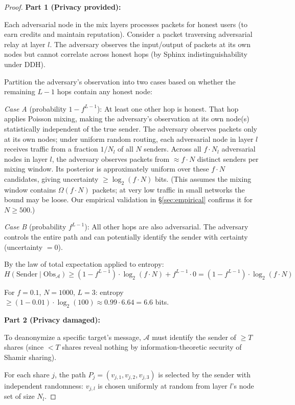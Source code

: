 \documentclass[11pt,a4paper]{article}
\newcommand{\Adv}{\mathcal{A}}
\begin{document}
\begin{proof}
\textbf{Part 1 (Privacy provided):}

Each adversarial node in the mix layers processes packets for honest users (to earn credits and maintain reputation). Consider a packet traversing adversarial relay at layer $l$. The adversary observes the input/output of packets at its own nodes but cannot correlate across honest hops (by Sphinx indistinguishability under DDH).

Partition the adversary's observation into two cases based on whether the remaining $L-1$ hops contain any honest node:

\textit{Case A} (probability $1 - f^{L-1}$): At least one other hop is honest. That hop applies Poisson mixing, making the adversary's observation at its own node(s) statistically independent of the true sender. The adversary observes packets only at its own nodes; under uniform random routing, each adversarial node in layer $l$ receives traffic from a fraction $1/N_l$ of all $N$ senders. Across all $f \cdot N_l$ adversarial nodes in layer $l$, the adversary observes packets from $\approx f \cdot N$ distinct senders per mixing window. Its posterior is approximately uniform over these $f \cdot N$ candidates, giving uncertainty $\geq \log_2(f \cdot N)$ bits. (This assumes the mixing window contains $\Omega(f \cdot N)$ packets; at very low traffic in small networks the bound may be loose. Our empirical validation in \S\ref{sec:empirical} confirms it for $N \geq 500$.)

\textit{Case B} (probability $f^{L-1}$): All other hops are also adversarial. The adversary controls the entire path and can potentially identify the sender with certainty (uncertainty $= 0$).

By the law of total expectation applied to entropy:
\[
H(\text{Sender} \mid \text{Obs}_\Adv) \geq (1 - f^{L-1}) \cdot \log_2(f \cdot N) + f^{L-1} \cdot 0 = (1 - f^{L-1}) \cdot \log_2(f \cdot N)
\]

For $f = 0.1$, $N = 1000$, $L = 3$: entropy $\geq (1 - 0.01) \cdot \log_2(100) \approx 0.99 \cdot 6.64 = 6.6$ bits.

\textbf{Part 2 (Privacy damaged):}

To deanonymize a specific target's message, $\Adv$ must identify the sender of $\geq T$ shares (since $< T$ shares reveal nothing by information-theoretic security of Shamir sharing).

For each share $j$, the path $P_j = (v_{j,1}, v_{j,2}, v_{j,3})$ is selected by the sender with independent randomness: $v_{j,l}$ is chosen uniformly at random from layer $l$'s node set of size $N_l$.


\end{proof}
\end{document}
